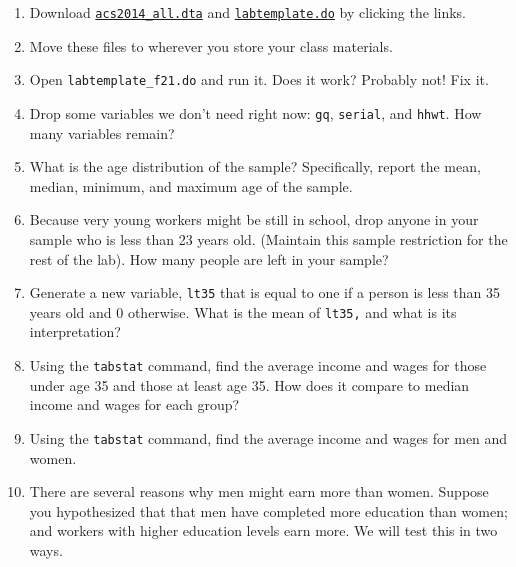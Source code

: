 \documentclass[11pt]{article}
\begin{document}
\begin{enumerate}
\def\labelenumi{\arabic{enumi}.}
\item
  Download \href{materials/acs2014_all.dta}{\texttt{acs2014\_all.dta}}
  and \href{materials/labtemplate_f21.do}{\texttt{labtemplate.do}} by
  clicking the links.
\item
  Move these files to wherever you store your class materials.
\item
  Open \texttt{labtemplate\_f21.do} and run it. Does it work? Probably
  not! Fix it.
\item
  Drop some variables we don't need right now: \texttt{gq},
  \texttt{serial}, and \texttt{hhwt}. How many variables remain?
\item
  What is the age distribution of the sample? Specifically, report the
  mean, median, minimum, and maximum age of the sample.
\item
  Because very young workers might be still in school, drop anyone in
  your sample who is less than 23 years old. (Maintain this sample
  restriction for the rest of the lab). How many people are left in your
  sample?
\item
  Generate a new variable, \texttt{lt35} that is equal to one if a
  person is less than 35 years old and 0 otherwise. What is the mean of
  \texttt{lt35,} and what is its interpretation?
\item
  Using the \texttt{tabstat} command, find the average income and wages
  for those under age 35 and those at least age 35. How does it compare
  to median income and wages for each group?
\item
  Using the \texttt{tabstat} command, find the average income and wages
  for men and women.
\item
  There are several reasons why men might earn more than women. Suppose
  you hypothesized that that men have completed more education than
  women; and workers with higher education levels earn more. We will
  test this in two ways.


\end{enumerate}
\end{document}
